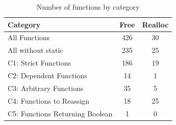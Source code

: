 \begin{table}[H]
   \centering
   \begin{tabularx}{0.7\linewidth}{l|c|c}

      Category & Free & Realloc \\
      \hline

      All Functions& 426 & 30 \\

      All without static& 235 & 25 \\

\hline
      C1: Strict Functions& 186 & 19 \\

      C2: Dependent Functions& 14 & 1 \\

      C3: Arbitrary Functions& 35 & 5 \\

      C4: Functions to Reassign& 18 & 25 \\

      C5: Functions Returning Boolean& 1 & 0 \\

   \end{tabularx}
   \caption{Number of functions by category}
   \label{tab:categories:overview}
\end{table}

